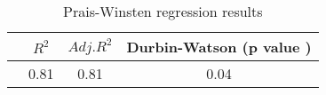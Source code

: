 \begin{table}[ht]
\centering
\begin{tabular}{lccc}
  \hline
 & $R^2$ & $Adj. R^2$ & Durbin-Watson (p value ) \\ 
  \hline
 & 0.81 & 0.81 & 0.04 \\ 
   \hline
\end{tabular}
\caption{Prais-Winsten regression results} 
\end{table}
